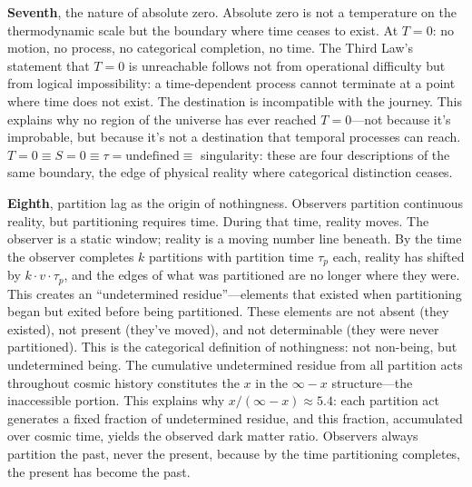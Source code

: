 \textbf{Seventh}, the nature of absolute zero. Absolute zero is not a temperature on the thermodynamic scale but the boundary where time ceases to exist. At $T = 0$: no motion, no process, no categorical completion, no time. The Third Law's statement that $T = 0$ is unreachable follows not from operational difficulty but from logical impossibility: a time-dependent process cannot terminate at a point where time does not exist. The destination is incompatible with the journey. This explains why no region of the universe has ever reached $T = 0$---not because it's improbable, but because it's not a destination that temporal processes can reach. $T = 0 \equiv S = 0 \equiv \tau = \text{undefined} \equiv$ singularity: these are four descriptions of the same boundary, the edge of physical reality where categorical distinction ceases.

\textbf{Eighth}, partition lag as the origin of nothingness. Observers partition continuous reality, but partitioning requires time. During that time, reality moves. The observer is a static window; reality is a moving number line beneath. By the time the observer completes $k$ partitions with partition time $\tau_p$ each, reality has shifted by $k \cdot v \cdot \tau_p$, and the edges of what was partitioned are no longer where they were. This creates an ``undetermined residue''---elements that existed when partitioning began but exited before being partitioned. These elements are not absent (they existed), not present (they've moved), and not determinable (they were never partitioned). This is the categorical definition of nothingness: not non-being, but undetermined being. The cumulative undetermined residue from all partition acts throughout cosmic history constitutes the $x$ in the $\infty - x$ structure---the inaccessible portion. This explains why $x/(\infty - x) \approx 5.4$: each partition act generates a fixed fraction of undetermined residue, and this fraction, accumulated over cosmic time, yields the observed dark matter ratio. Observers always partition the past, never the present, because by the time partitioning completes, the present has become the past.

